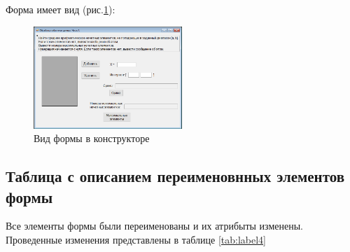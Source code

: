 Форма имеет вид (рис.\ref{fig:FormInConstruct4}):

\begin{figure}[!h]
    \centering
    \includegraphics[width = 0.5\textwidth]{images/Task4/FormInConstructor.png}
    \caption{Вид формы в конструкторе}
    \label{fig:FormInConstruct4}
\end{figure}

\newpage
\subsection{Таблица с описанием переименовнных элементов формы}

Все элементы формы были переименованы и их атрибыты изменены. Проведенные изменения представлены в таблице \ref{tab:label4}

